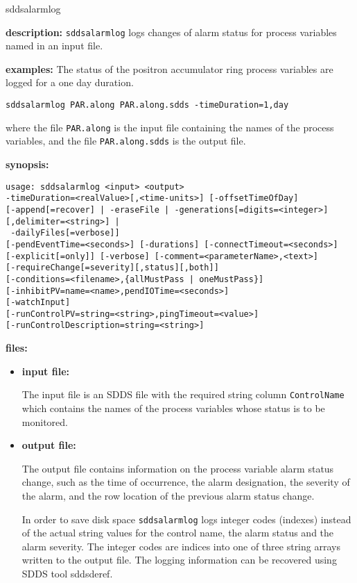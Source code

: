 \begin{sddsprog}{sddsalarmlog}
\item \textbf{description:}
\verb+sddsalarmlog+ logs changes of alarm status for process variables named in an input file.
\item \textbf{examples:}
The status of the positron accumulator ring process variables are logged
for a one day duration.
\begin{verbatim}
sddsalarmlog PAR.along PAR.along.sdds -timeDuration=1,day
\end{verbatim}
where the file \verb+PAR.along+ is the input file containing the names of the
process variables, and the file \verb+PAR.along.sdds+ is the output file.

\item \textbf{synopsis:}
\begin{verbatim}
usage: sddsalarmlog <input> <output>
-timeDuration=<realValue>[,<time-units>] [-offsetTimeOfDay]
[-append[=recover] | -eraseFile | -generations[=digits=<integer>][,delimiter=<string>] |
 -dailyFiles[=verbose]]
[-pendEventTime=<seconds>] [-durations] [-connectTimeout=<seconds>]
[-explicit[=only]] [-verbose] [-comment=<parameterName>,<text>]
[-requireChange[=severity][,status][,both]]
[-conditions=<filename>,{allMustPass | oneMustPass}]
[-inhibitPV=name=<name>,pendIOTime=<seconds>]
[-watchInput]
[-runControlPV=string=<string>,pingTimeout=<value>]
[-runControlDescription=string=<string>]
\end{verbatim}

\item \textbf{files:}
\begin{itemize}
  \item \textbf{input file:}\par
The input file is an SDDS file with the required string column {\tt ControlName}
which contains the names of the process variables whose status is to be monitored.

  \item \textbf{output file:}\par
The output file contains information on the process variable alarm status
change, such as the time of occurrence, the alarm designation, the severity of the alarm, and the
row location of the previous alarm status change.

In order to save disk space {\tt sddsalarmlog} logs integer codes
(indexes) instead of the actual string values for the control name,
the alarm status and the alarm severity. The integer codes are indices
into one of three string arrays written to the output file. The logging information
can be recovered using SDDS tool sddsderef.


\end{itemize}
\end{sddsprog}
